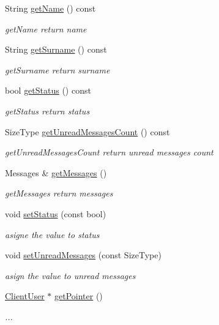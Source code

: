 \begin{DoxyCompactItemize}
String \hyperlink{classClientUser_a42db3fc8470f3701f724b47e2d63dc8d}{get\+Name} () const 
\begin{DoxyCompactList}\small\item\em get\+Name return name \end{DoxyCompactList}\item 
String \hyperlink{classClientUser_a9654ca77ca24fa01949feec8d5dc762c}{get\+Surname} () const 
\begin{DoxyCompactList}\small\item\em get\+Surname return surname \end{DoxyCompactList}\item 
bool \hyperlink{classClientUser_ae091b81e5e1ac86a11d3de8135cc36aa}{get\+Status} () const 
\begin{DoxyCompactList}\small\item\em get\+Status return status \end{DoxyCompactList}\item 
Size\+Type \hyperlink{classClientUser_aad8dc8d49e94f68a8bbbe324a55e68d9}{get\+Unread\+Messages\+Count} () const 
\begin{DoxyCompactList}\small\item\em get\+Unread\+Messages\+Count return unread messages count \end{DoxyCompactList}\item 
Messages \& \hyperlink{classClientUser_a1cb9cc387ca7e6fb374f9745409ad552}{get\+Messages} ()
\begin{DoxyCompactList}\small\item\em get\+Messages return messages \end{DoxyCompactList}\item 
void \hyperlink{classClientUser_a9fc92b13a43c208773ea25aade33ba54}{set\+Status} (const bool)
\begin{DoxyCompactList}\small\item\em asigne the value to status \end{DoxyCompactList}\item 
void \hyperlink{classClientUser_afa0747fa782b945e0f1430605dde5f4e}{set\+Unread\+Messages} (const Size\+Type)
\begin{DoxyCompactList}\small\item\em asign the value to unread messages \end{DoxyCompactList}\item 
\hyperlink{classClientUser}{Client\+User} $\ast$ \hyperlink{classClientUser_a8144e58927e95bff49485c3a81c40893}{get\+Pointer} ()
\begin{DoxyCompactList}\small\item\em ... \end{DoxyCompactList}\end{DoxyCompactItemize}


